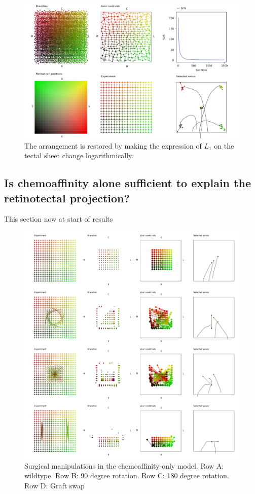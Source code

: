 \documentclass[11pt, a4paper]{article}
\begin{document}
\begin{figure}
\includegraphics[width=\linewidth]{./images/j4_eel_ephb_wt.png}
\caption{The arrangement is restored by making the expression of $L_1$ on the
tectal sheet change logarithmically.}
\label{f:eel_oneattractive}
\end{figure}

\subsection*{Is chemoaffinity alone sufficient to explain the retinotectal projection?}

This section now at start of results

\begin{figure}
\includegraphics[width=\linewidth]{./images/fig_chemo_manipulations.png}
\caption{Surgical manipulations in the chemoaffinity-only model. Row A: wildtype. Row B: 90 degree
rotation. Row C: 180 degree rotation. Row D: Graft swap}
\label{f:chsurg}
\end{figure}
\end{document}
